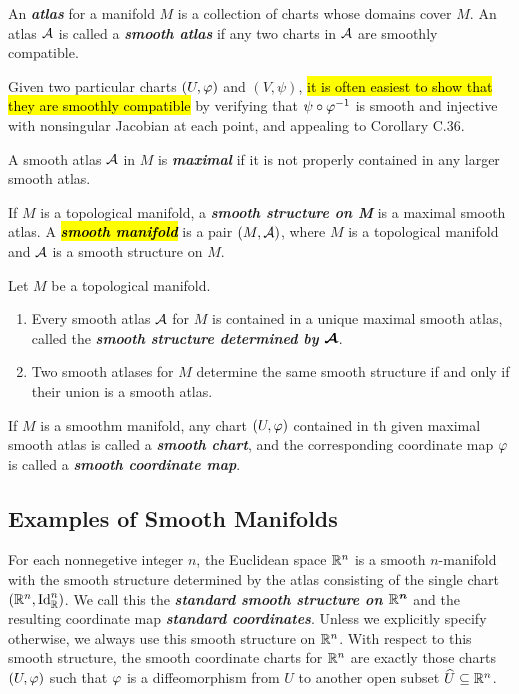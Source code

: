 \dfn An \textbf{\textit{atlas}} for a manifold $M$ is a collection of charts whose domains cover $M$. An atlas $\mathcal{A}$ is called a \textbf{\textit{smooth atlas}} if any two charts in $\mathcal{A}$ are smoothly compatible.

\nb Given two particular charts $(U, \varphi)$ and $(V,\psi)$, \hl{it is often easiest to show that they are smoothly compatible} by verifying that $\psi\circ\varphi^{-1}$ is smooth and injective with nonsingular Jacobian at each point, and appealing to Corollary C.36.

\dfn A smooth atlas $\mathcal{A}$ in $M$ is \textbf{\textit{maximal}} if it is not properly contained in any larger smooth atlas. 

\dfn If $M$ is a topological manifold, a \textbf{\textit{smooth structure on M}} is a maximal smooth atlas. A \hl{\textbf{\textit{smooth manifold}}} is a pair $(M, \mathcal{A})$, where $M$ is a topological manifold and $\mathcal{A}$ is a smooth structure on $M$.

\setcounter{thm}{16}

\begin{thm}Let $M$ be a topological manifold.
\begin{enumerate}
    \item Every smooth atlas $\mathcal{A}$ for $M$ is contained in a unique maximal smooth atlas, called the \textbf{\textit{smooth structure determined by $\boldsymbol{\mathcal{A}}$}}.
    \item Two smooth atlases for $M$ determine the same smooth structure if and only if their union is a smooth atlas.
\end{enumerate}
\end{thm}

\dfn If $M$ is a smoothm manifold, any chart $(U, \varphi)$ contained in th given maximal smooth atlas is called a \textbf{\textit{smooth chart}}, and the corresponding coordinate map $\varphi$ is called a \textbf{\textit{smooth coordinate map}}.

\subsection{Examples of Smooth Manifolds}

\setcounter{thm}{21}

\begin{ex}
For each nonnegetive integer $n$, the Euclidean space $\mathbb{R}^n$ is a smooth $n$-manifold with the smooth structure determined by the atlas consisting of the single chart $(\mathbb{R}^n, \text{Id}_\mathbb{R}^n)$. We call this the \textbf{\textit{standard smooth structure on $\boldsymbol{\mathbb{R}^n}$}} and the resulting coordinate map \textbf{\textit{standard coordinates}}. Unless we explicitly specify otherwise, we always use this smooth structure on $\mathbb{R}^n$. With respect to this smooth structure, the smooth coordinate charts for $\mathbb{R}^n$ are exactly those charts $(U,\varphi)$ such that $\varphi$ is a diffeomorphism from $U$ to another open subset $\widehat U\subseteq \mathbb{R}^n$.
\end{ex}

